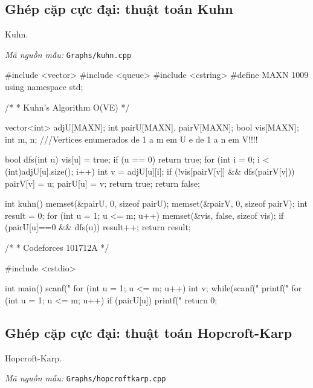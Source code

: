 \documentclass[11pt]{article}
\newcommand{\codepath}[1]{\par\noindent\textit{Mã nguồn mẫu:} \texttt{#1}\par}
\begin{document}
\subsection{Ghép cặp cực đại: thuật toán Kuhn}

Kuhn.

\codepath{Graphs/kuhn.cpp}

\begingroup\scriptsize
\begin{vncode}
#include <vector>
#include <queue>
#include <cstring>
#define MAXN 1009
using namespace std;

/*
 * Kuhn's Algorithm O(VE)
 */

vector<int> adjU[MAXN];
int pairU[MAXN], pairV[MAXN];
bool vis[MAXN];
int m, n;
///Vertices enumerados de 1 a m em U e de 1 a n em V!!!!

bool dfs(int u) {
    vis[u] = true;
    if (u == 0) return true;
    for (int i = 0; i < (int)adjU[u].size(); i++) {
        int v = adjU[u][i];
        if (!vis[pairV[v]] && dfs(pairV[v])) {
            pairV[v] = u; pairU[u] = v;
            return true;
        }
    }
    return false;
}

int kuhn() {
    memset(&pairU, 0, sizeof pairU);
    memset(&pairV, 0, sizeof pairV);
    int result = 0;
    for (int u = 1; u <= m; u++) {
        memset(&vis, false, sizeof vis);
        if (pairU[u]==0 && dfs(u)) result++;
    }
    return result;
}

/*
 * Codeforces 101712A
 */

#include <cstdio>

int main() {
	scanf("%
	for (int u = 1; u <= m; u++) {
		int v;
		while(scanf("%
	}
	printf("%
	for (int u = 1; u <= m; u++) {
		if (pairU[u]) printf("%
	}
	return 0;
}
\end{vncode}
\endgroup


\subsection{Ghép cặp cực đại: thuật toán Hopcroft-Karp}

Hopcroft-Karp.

\codepath{Graphs/hopcroftkarp.cpp}
\end{document}
